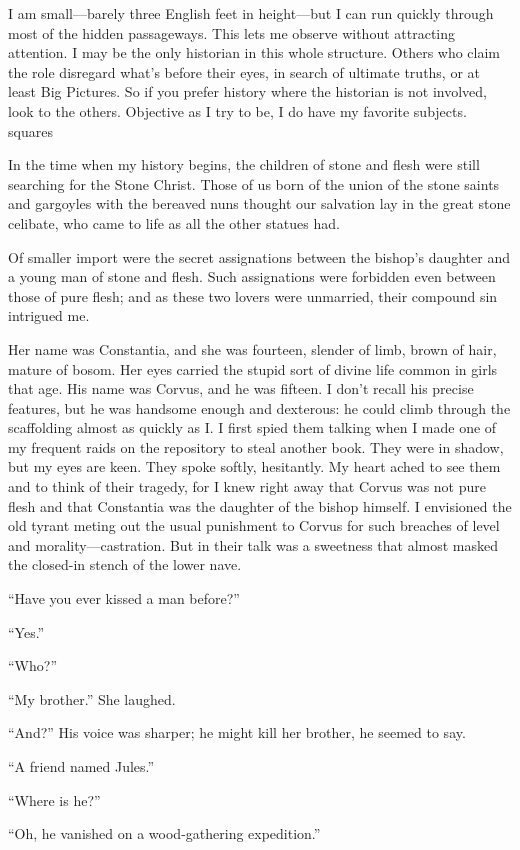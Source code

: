 I am small—barely three English feet in height—but I can run quickly through most of the hidden passageways. This lets me observe without attracting attention. I may be the only historian in this whole structure. Others who claim the role disregard what’s before their eyes, in search of ultimate truths, or at least Big Pictures. So if you prefer history where the historian is not involved, look to the others. Objective as I try to be, I do have my favorite subjects.
squares

In the time when my history begins, the children of stone and flesh were still searching for the Stone Christ. Those of us born of the union of the stone saints and gargoyles with the bereaved nuns thought our salvation lay in the great stone celibate, who came to life as all the other statues had.

Of smaller import were the secret assignations between the bishop’s daughter and a young man of stone and flesh. Such assignations were forbidden even between those of pure flesh; and as these two lovers were unmarried, their compound sin intrigued me.

Her name was Constantia, and she was fourteen, slender of limb, brown of hair, mature of bosom. Her eyes carried the stupid sort of divine life common in girls that age. His name was Corvus, and he was fifteen. I don’t recall his precise features, but he was handsome enough and dexterous: he could climb through the scaffolding almost as quickly as I. I first spied them talking when I made one of my frequent raids on the repository to steal another book. They were in shadow, but my eyes are keen. They spoke softly, hesitantly. My heart ached to see them and to think of their tragedy, for I knew right away that Corvus was not pure flesh and that Constantia was the daughter of the bishop himself. I envisioned the old tyrant meting out the usual punishment to Corvus for such breaches of level and morality—castration. But in their talk was a sweetness that almost masked the closed-in stench of the lower nave.

“Have you ever kissed a man before?”

“Yes.”

“Who?”

“My brother.” She laughed.

“And?” His voice was sharper; he might kill her brother, he seemed to say.

“A friend named Jules.”

“Where is he?”

“Oh, he vanished on a wood-gathering expedition.”

